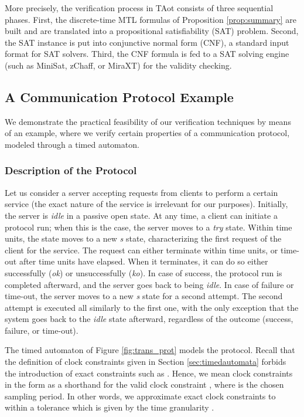\documentclass[a4paper]{article}
\newcommand{\tazot}{\textsf{TA}ot}
\theoremstyle{plain}
\theoremstyle{definition}
\begin{document}
More precisely, the verification process in \tazot{} consists of three sequential phases.
First, the discrete-time MTL formulas of Proposition \ref{prop:summary} are built and are translated into a propositional satisfiability (SAT) problem.
Second, the SAT instance is put into conjunctive normal form (CNF), a standard input format for SAT solvers.
Third, the CNF formula is fed to a SAT solving engine (such as MiniSat, zChaff, or MiraXT) for the validity checking.






\subsection{A Communication Protocol Example}
We demonstrate the practical feasibility of our verification techniques by means of an example, where we verify certain properties of a communication protocol, modeled through a timed automaton.

\subsubsection{Description of the Protocol}
Let us consider a server accepting requests from clients to perform a certain service (the exact nature of the service is irrelevant for our purposes).
Initially, the server is \emph{idle} in a passive open state.
At any time, a client can initiate a protocol run; when this is the case, the server moves to a \emph{try} state.
Within  time units, the state moves to a new \emph{s} state, characterizing the first request of the client for the service.
The request can either terminate within  time units, or time-out after  time units have elapsed.
When it terminates, it can do so either successfully (\emph{ok}) or unsuccessfully (\emph{ko}).
In case of success, the protocol run is completed afterward, and the server goes back to being \emph{idle}.
In case of failure or time-out, the server moves to a new \emph{s} state for a second attempt.
The second attempt is executed all similarly to the first one, with the only exception that the system goes back to the \emph{idle} state afterward, regardless of the outcome (success, failure, or time-out).

The timed automaton of Figure \ref{fig:trans_prot} models the protocol.
Recall that the definition of clock constraints given in Section \ref{sec:timedautomata} forbids the introduction of exact constraints such as .
Hence, we mean clock constraints in the form  as a shorthand for the valid clock constraint , where  is the chosen sampling period.
In other words, we approximate exact clock constraints to within a tolerance which is given by the time granularity .
\end{document}
